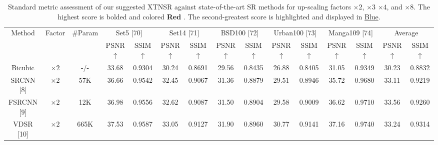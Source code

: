 \documentclass[twocolumn]{svjour3}          %
\begin{document}
\begin{table}
\centering
\caption{Standard metric assessment of our suggested XTNSR against state-of-the-art SR methods for up-scaling factors $\times 2$, $\times 3$ $\times 4$, and $\times 8$. The highest score is bolded and colored {\color{red}\textbf{Red }}. The second-greatest score is highlighted and displayed in {\color{blue}\underline{Blue}}.}

\label{table1}
\setlength{\tabcolsep}{2 pt}
\begin{tabular}{|c|c|c|cc|cc|cc|cc|cc|cc|}
\hline
\multirow{2}{*}{Method} & \multirow{2}{*}{Factor} & \multirow{2}{*}{\#Param}& \multicolumn{2}{c|}{Set5 [70]}& \multicolumn{2}{c|}{Set14 [71]}& \multicolumn{2}{c|}{BSD100 [72]}& \multicolumn{2}{c|}{Urban100 [73]}& \multicolumn{2}{c|}{Manga109 [74]}& \multicolumn{2}{c|}{Average}\\


 \cline{4-15}&&& \multicolumn{1}{c|}{PSNR$\uparrow$}  & SSIM{$\uparrow$}   & \multicolumn{1}{c|}{PSNR$\uparrow$}  & SSIM {$\uparrow$}   & \multicolumn{1}{c|}{PSNR$\uparrow$}  & SSIM {$\uparrow$}   & \multicolumn{1}{c|}{PSNR$\uparrow$}  & SSIM {$\uparrow$}  & \multicolumn{1}{c|}{PSNR$\uparrow$}  & SSIM {$\uparrow$}   & \multicolumn{1}{c|}{PSNR$\uparrow$}  & SSIM {$\uparrow$}  \\
 \hline

Bicubic&$\times2$ & -/-& \multicolumn{1}{c|}{33.68 } & 0.9304  & \multicolumn{1}{c|}{30.24 } &0.8691  & \multicolumn{1}{c|}{29.56 } & 0.8435  & \multicolumn{1}{c|}{26.88 } & 0.8405  & \multicolumn{1}{c|}{31.05 } & 0.9349&
\multicolumn{1}{c|}{30.23} & 0.8832 \\


SRCNN [8] & $\times 2$ & 57K& \multicolumn{1}{c|}{36.66 } & 0.9542  & \multicolumn{1}{c|}{32.45 } & 0.9067  &\multicolumn{1}{c|}{31.36 } & 0.8879  & \multicolumn{1}{c|}{29.51 } &0.8946 & \multicolumn{1}{c|}{35.72} &0.9680
&\multicolumn{1}{c|}{33.11} & 0.9219\\

FSRCNN [9]& $\times 2$& 12K & \multicolumn{1}{c|}{36.98} &0.9556& \multicolumn{1}{c|}{32.62} & 0.9087 &\multicolumn{1}{c|}{31.50} &0.8904& \multicolumn{1}{c|}{29.58} &0.9009& \multicolumn{1}{c|}{36.62} &0.9710
&\multicolumn{1}{c|}{33.56} & 0.9260\\

VDSR [10]& $\times 2$&665K& \multicolumn{1}{c|}{37.53} & 0.9587 & \multicolumn{1}{c|}{33.05} & 0.9127 &\multicolumn{1}{c|}{31.90} & 0.8960& \multicolumn{1}{c|}{30.77} & 0.9141 & \multicolumn{1}{c|}{37.16} & 0.9740
&\multicolumn{1}{c|}{33.24} & 0.9314\\


\end{tabular}
\end{table}
\end{document}
